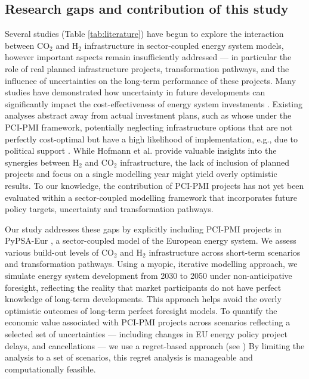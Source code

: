 \documentclass[pdflatex,sn-nature]{sn-jnl}
\theoremstyle{thmstyleone}%
\theoremstyle{thmstyletwo}%
\theoremstyle{thmstylethree}%
\begin{document}
\subsection{Research gaps and contribution of this study}
Several studies (Table \ref{tab:literature}) have begun to explore the interaction between CO$_2$ and H$_2$ infrastructure in sector-coupled energy system models, however important aspects remain insufficiently addressed --- in particular the role of real planned infrastructure projects, transformation pathways, and the influence of uncertainties on the long-term performance of these projects. Many studies have demonstrated how uncertainty in future developments can significantly impact the cost-effectiveness of energy system investments \cite{vanderweijdeEconomicsPlanningElectricity2012,mobiusRegretAnalysisInvestment2020,neumannNearoptimalFeasibleSpace2021,vangreevenbroekLittleLoseCase2025,priceModellingGenerateAlternatives2017,yueReviewApproachesUncertainty2018}. Existing analyses abstract away from actual investment plans, such as whose under the PCI-PMI framework, potentially neglecting infrastructure options that are not perfectly cost-optimal but have a high likelihood of implementation, e.g., due to political support \cite{vangreevenbroekLittleLoseCase2025,trutnevyteDoesCostOptimization2016}. 
While Hofmann et al. \cite{hofmannH2CO2Network2025} provide valuable insights into the synergies between H$_2$ and CO$_2$ infrastructure, the lack of inclusion of planned projects and focus on a single modelling year might yield overly optimistic results. To our knowledge, the contribution of PCI-PMI projects has not yet been evaluated within a sector-coupled modelling framework that incorporates future policy targets, uncertainty and transformation pathways.

Our study addresses these gaps by explicitly including PCI-PMI projects in PyPSA-Eur \cite{horschPyPSAEurOpenOptimisation2018}, a sector-coupled model of the European energy system. We assess various build-out levels of CO$_2$ and H$_2$ infrastructure across short-term scenarios and transformation pathways. Using a myopic, iterative modelling approach, we simulate energy system development from 2030 to 2050 under non-anticipative foresight, reflecting the reality that market participants do not have perfect knowledge of long-term developments. This approach helps avoid the overly optimistic outcomes of long-term perfect foresight models. To quantify the economic value associated with PCI-PMI projects across scenarios reflecting a selected set of uncertainties --- including changes in EU energy policy project delays, and cancellations --- we use a regret-based approach (see ) By limiting the analysis to a set of scenarios, this regret analysis is manageable and computationally feasible.
\end{document}
